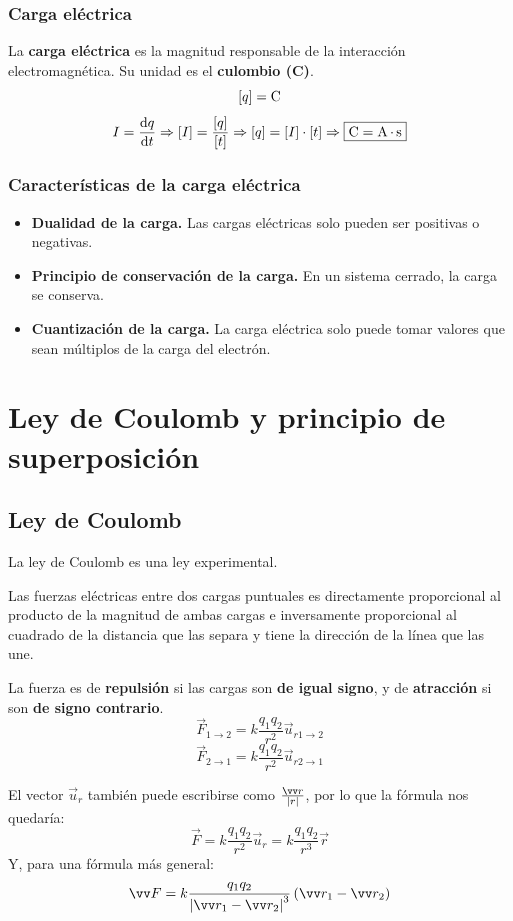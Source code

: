 \documentclass[a4paper]{book}
\begin{document}
\subsubsection{Carga eléctrica}
La \textbf{carga eléctrica} es la magnitud responsable de la interacción electromagnética. Su unidad es el \textbf{culombio (C)}.
\[[q] = \operatorname{C} \]
\[I = \dv{q}{t} \Rightarrow [I] = \frac{[q]}{[t]}\Rightarrow [q] = [I]\cdot [t] \Rightarrow \boxed{\operatorname{C} = \operatorname{A} \cdot \operatorname{s}}\]

\subsubsection{Características de la carga eléctrica}
\vspace{1.5\parskip}
\begin{itemize}
	\item \textbf{Dualidad de la carga.} Las cargas eléctricas solo pueden ser positivas o negativas.
	\item \textbf{Principio de conservación de la carga.} En un sistema cerrado, la carga se conserva.
	\item \textbf{Cuantización de la carga.} La carga eléctrica solo puede tomar valores que sean múltiplos de la carga del electrón.
\end{itemize}

\section{Ley de Coulomb y principio de superposición}
\subsection{Ley de Coulomb}
La ley de Coulomb es una ley experimental.

Las fuerzas eléctricas entre dos cargas puntuales es directamente proporcional al producto de la magnitud de ambas cargas e inversamente proporcional al cuadrado de la distancia que las separa y tiene la dirección de la línea que las une.

La fuerza es de \textbf{repulsión} si las cargas son \textbf{de igual signo}, y de \textbf{atracción} si son \textbf{de signo contrario}.
\[\vec{F}_{1\to 2} = k\frac{q_1q_2}{r^2}\vec{u}_{r1\to 2}\]
\[\vec{F}_{2\to 1} = k\frac{q_1q_2}{r^2}\vec{u}_{r2\to 1}\]

El vector $ \vec{u}_r $ también puede escribirse como $ \frac{\vec{r}}{\abs{r}} $, por lo que la fórmula nos quedaría:
\[\vec{F} = k\frac{q_1q_2}{r^2}\vec{u}_r = k\frac{q_1q_2}{r^3}\vec{r}\]
Y, para una fórmula más general:
\[\vec{F}=k\frac{q_1q_2}{\abs{\vec{r}_1 - \vec{r}_2}^3}\left( \vec{r}_1 - \vec{r}_2 \right)\]
\end{document}
